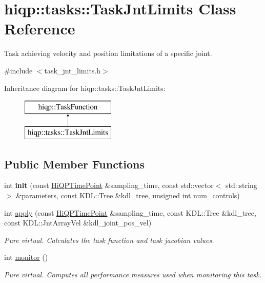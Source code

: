\hypertarget{classhiqp_1_1tasks_1_1TaskJntLimits}{\section{hiqp\-:\-:tasks\-:\-:Task\-Jnt\-Limits Class Reference}
\label{classhiqp_1_1tasks_1_1TaskJntLimits}
}


Task achieving velocity and position limitations of a specific joint.  




{\ttfamily \#include $<$task\-\_\-jnt\-\_\-limits.\-h$>$}

Inheritance diagram for hiqp\-:\-:tasks\-:\-:Task\-Jnt\-Limits\-:\begin{figure}[H]
\begin{center}
\leavevmode
\includegraphics[height=2.000000cm]{classhiqp_1_1tasks_1_1TaskJntLimits}
\end{center}
\end{figure}
\subsection*{Public Member Functions}
\begin{DoxyCompactItemize}
\item 
\hypertarget{classhiqp_1_1tasks_1_1TaskJntLimits_a341172514f29b04318d4e49ee23474c5}{int {\bfseries init} (const \hyperlink{classhiqp_1_1HiQPTimePoint}{Hi\-Q\-P\-Time\-Point} \&sampling\-\_\-time, const std\-::vector$<$ std\-::string $>$ \&parameters, const K\-D\-L\-::\-Tree \&kdl\-\_\-tree, unsigned int num\-\_\-controls)}\label{classhiqp_1_1tasks_1_1TaskJntLimits_a341172514f29b04318d4e49ee23474c5}

\item 
int \hyperlink{classhiqp_1_1tasks_1_1TaskJntLimits_a3ab9389dfc0e3646fbd1fd670d7285fe}{apply} (const \hyperlink{classhiqp_1_1HiQPTimePoint}{Hi\-Q\-P\-Time\-Point} \&sampling\-\_\-time, const K\-D\-L\-::\-Tree \&kdl\-\_\-tree, const K\-D\-L\-::\-Jnt\-Array\-Vel \&kdl\-\_\-joint\-\_\-pos\-\_\-vel)
\begin{DoxyCompactList}\small\item\em {\itshape Pure virtual}. Calculates the task function and task jacobian values. \end{DoxyCompactList}\item 
int \hyperlink{classhiqp_1_1tasks_1_1TaskJntLimits_ace02732e6cd3cc4087baf6e7df5e2723}{monitor} ()
\begin{DoxyCompactList}\small\item\em {\itshape Pure virtual}. Computes all performance measures used when monitoring this task. \end{DoxyCompactList}\end{DoxyCompactItemize}

